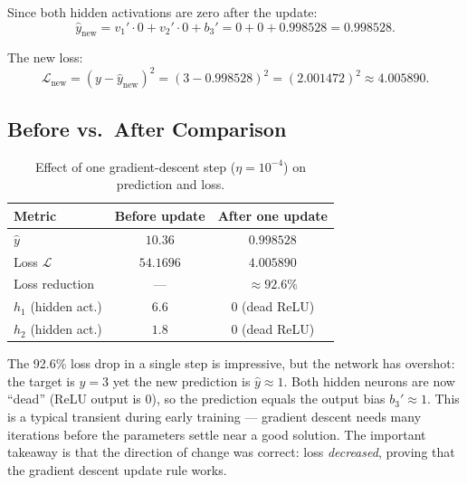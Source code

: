 \documentclass[12pt,a4paper]{article}
\newcommand{\Loss}{\mathcal{L}}
\newcommand{\yhat}{\hat{y}}
\begin{document}
Since both hidden activations are zero after the update:
\begin{equation}
  \yhat_{\text{new}} = v_1' \cdot 0 + v_2' \cdot 0 + b_3'
                     = 0 + 0 + 0.998528 = 0.998528.
  \label{eq:yhat-new}
\end{equation}

The new loss:
\begin{equation}
  \Loss_{\text{new}} = (y - \yhat_{\text{new}})^2
                     = (3 - 0.998528)^2
                     = (2.001472)^2
                     \approx \mathbf{4.005890}.
  \label{eq:loss-new}
\end{equation}

\subsection{Before vs.\ After Comparison}

\begin{table}[ht]
\centering
\caption{Effect of one gradient-descent step ($\eta=10^{-4}$) on prediction
         and loss.}
\label{tab:before-after}
\begin{tabular}{lcc}
\toprule
\textbf{Metric} & \textbf{Before update} & \textbf{After one update} \\
\midrule
$\yhat$             & $10.36$    & $0.998528$ \\
Loss $\Loss$        & $54.1696$  & $4.005890$ \\
Loss reduction      & ---        & $\approx 92.6\%$ \\
$h_1$ (hidden act.) & $6.6$      & $0$ (dead ReLU) \\
$h_2$ (hidden act.) & $1.8$      & $0$ (dead ReLU) \\
\bottomrule
\end{tabular}
\end{table}

\begin{example}
The 92.6\% loss drop in a single step is impressive, but the network has
overshot: the target is $y=3$ yet the new prediction is $\yhat \approx 1$.
Both hidden neurons are now ``dead'' (ReLU output is 0), so the prediction
equals the output bias $b_3' \approx 1$.
This is a typical transient during early training --- gradient descent needs
many iterations before the parameters settle near a good solution.
The important takeaway is that the direction of change was correct: loss
\emph{decreased}, proving that the gradient descent update rule works.
\end{example}
\end{document}
